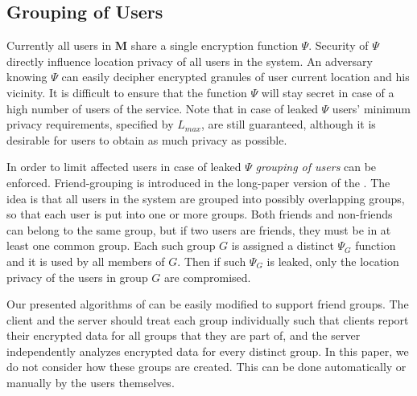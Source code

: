 \subsection{Grouping of Users}\label{subsec:grouping}

Currently all users in $\mathbf{M}$ share a single encryption function $\Psi$.
Security of $\Psi$ directly influence location privacy of all users in the
system. An adversary knowing $\Psi$ can easily decipher encrypted
granules of user current location and his vicinity. It is difficult to ensure
that the function $\Psi$ will stay secret in case of a high number of users
of the \vl service. Note that in case of leaked $\Psi$ users' minimum privacy 
requirements, specified by $L_{max}$, are still guaranteed, although it is 
desirable for users to obtain as much privacy as possible.

In order to limit affected users in case of leaked $\Psi$
\textit{grouping of users} can be enforced. Friend-grouping is
introduced in the long-paper version of the \ff \cite{ffinder}. The idea is
that all users in the system are grouped into possibly overlapping groups, so
that each user is put into one or more groups. Both friends and non-friends can
belong to the same group, but if two users are friends, they must be in at least
one common group. Each such group $G$ is assigned a distinct $\Psi_G$ function
and it is used by all members of $G$. Then if such $\Psi_G$ is leaked, only the
location privacy of the users in group $G$ are compromised.

Our presented algorithms of \vl can be easily modified to support friend
groups. The client and the server should treat each group individually such
that clients report their encrypted data for all groups that they are part of,
and the server independently analyzes encrypted data for every distinct group. 
In this paper, we do not consider how these groups are created. This can be done
automatically or manually by the users themselves.
